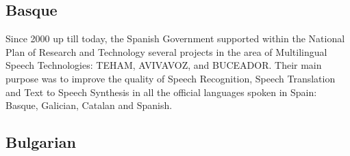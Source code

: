 \documentclass[10pt, plain]{../../metanetpaper}
\begin{document}
\clearpage


\label{european-funding-situation}



\begin{multicols}{2}

\begin{small}
\subsection*{Basque}
\label{sec:basque}

Since 2000 up till today, the Spanish Government supported within the National Plan of Research and Technology several projects in the area of Multilingual Speech Technologies: TEHAM, AVIVAVOZ, and BUCEADOR. Their main purpose was to improve the quality of Speech Recognition, Speech Translation and Text to Speech Synthesis in all the official languages spoken in Spain: Basque, Galician, Catalan and Spanish.

\subsection*{Bulgarian}
\label{sec:bulgarian}


\end{small}
\end{multicols}
\end{document}
